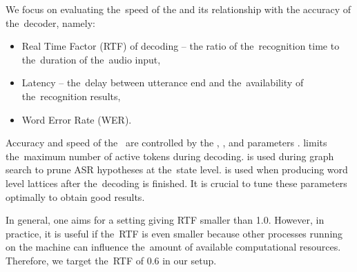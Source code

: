 

We focus on evaluating the~speed of the  and its relationship with the accuracy of the~decoder, namely:
\begin{itemize}
    \item Real Time Factor (RTF) of decoding -- the ratio of the~recognition time to the~duration of the~audio input,
    \item Latency -- the~delay between utterance end and the~availability of the~recognition results,
    \item Word Error Rate (WER).
\end{itemize}



Accuracy and speed of the~ are controlled by the ,   , and  parameters \cite{povey2011kaldi}.
 limits the~maximum number of active tokens during decoding.
 is used during graph search to prune ASR hypotheses at the~state level.
 is used when producing word level lattices after the~decoding is finished.
It is crucial to tune these parameters optimally to obtain good results.

In general, one aims for a setting giving RTF smaller than 1.0.
However, in practice, it is useful if the~RTF is even smaller because other processes running on the machine can influence the~amount of available computational resources.
Therefore, we target the~RTF of 0.6 in our setup.


